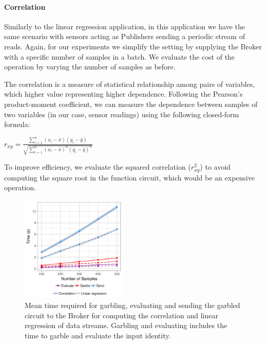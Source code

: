 
\paragraph{Correlation}



Similarly to the linear regression application, in this application we have the
same scenario with sensors acting as Publishers sending a periodic stream of
reads.  Again, for our experiments we simplify the setting by supplying the
Broker with a specific number of samples in a batch.  We evaluate the cost of
the operation by varying the number of samples as before.

The correlation is a measure of statistical relationship among pairs of
variables, which higher value representing higher dependence.  Following the
Pearson's product-moment coefficient, we can measure the dependence between
samples of two variables (in our case, sensor readings) using the following
closed-form formula:

$r_{xy} = \frac{\displaystyle\sum_{i=1}^n (x_i - \bar{x}) (y_i - \bar{y})}
{\sqrt{\displaystyle\sum_{i=1}^n (x_i - \bar{x})^n (y_i - \bar{y})^n}}$

To improve efficiency, we evaluate the squared correlation ($r_{xy}^2$) to avoid
computing the square root in the function circuit, which would be an expensive
operation.

\begin{figure}
  \includegraphics[width=0.45\textwidth]{plots/stream.png}
  \caption{Mean time required for garbling, evaluating and sending the garbled
  circuit to the Broker for computing the correlation and linear regression of
  data streams.  Garbling and evaluating
  includes the time to garble and evaluate the input identity.}
  \label{stream-times}
\end{figure}

